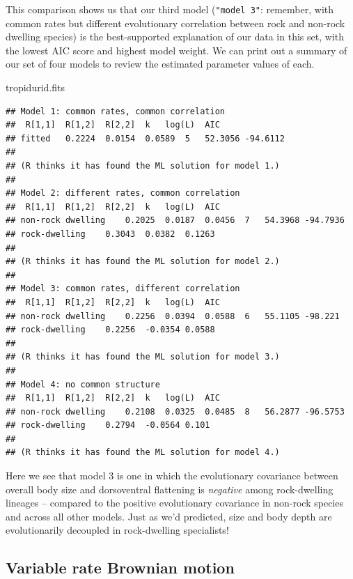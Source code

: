 \documentclass[fleqn,10pt,lineno]{wlpeerj} %
\newenvironment{Shaded}{\begin{snugshade}}{\end{snugshade}}
\newcommand{\NormalTok}[1]{#1}
\begin{document}
This comparison shows us that our third model (\texttt{"model\ 3"}: remember, with common rates but different evolutionary correlation between rock and non-rock dwelling species) is the best-supported explanation of our data in this set, with the lowest AIC score and highest model weight. We can print out a summary of our set of four models to review the estimated parameter values of each.

\begin{Shaded}
\begin{Highlighting}[]
\NormalTok{tropidurid.fits}
\end{Highlighting}
\end{Shaded}

\begin{verbatim}
## Model 1: common rates, common correlation 
##  R[1,1]  R[1,2]  R[2,2]  k   log(L)  AIC
## fitted   0.2224  0.0154  0.0589  5   52.3056 -94.6112    
## 
## (R thinks it has found the ML solution for model 1.)
## 
## Model 2: different rates, common correlation
##  R[1,1]  R[1,2]  R[2,2]  k   log(L)  AIC
## non-rock dwelling    0.2025  0.0187  0.0456  7   54.3968 -94.7936    
## rock-dwelling    0.3043  0.0382  0.1263  
## 
## (R thinks it has found the ML solution for model 2.)
## 
## Model 3: common rates, different correlation
##  R[1,1]  R[1,2]  R[2,2]  k   log(L)  AIC
## non-rock dwelling    0.2256  0.0394  0.0588  6   55.1105 -98.221 
## rock-dwelling    0.2256  -0.0354 0.0588  
## 
## (R thinks it has found the ML solution for model 3.)
## 
## Model 4: no common structure
##  R[1,1]  R[1,2]  R[2,2]  k   log(L)  AIC
## non-rock dwelling    0.2108  0.0325  0.0485  8   56.2877 -96.5753    
## rock-dwelling    0.2794  -0.0564 0.101   
## 
## (R thinks it has found the ML solution for model 4.)
\end{verbatim}

Here we see that model 3 is one in which the evolutionary covariance between overall body size and dorsoventral flattening is \emph{negative} among rock-dwelling lineages -- compared to the positive evolutionary covariance in non-rock species and across all other models. Just as we'd predicted, size and body depth are evolutionarily decoupled in rock-dwelling specialists!

\hypertarget{variable-rate-brownian-motion}{%
\subsection{Variable rate Brownian motion}\label{variable-rate-brownian-motion}}
\end{document}
